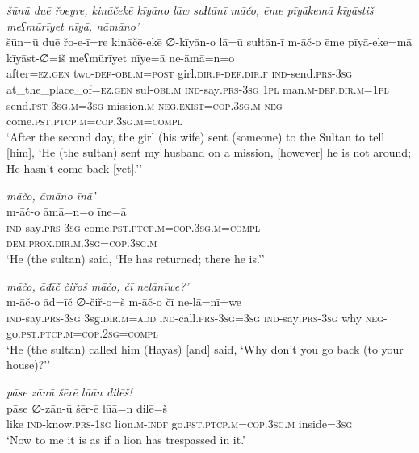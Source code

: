 \ea \label{ŽH.110}
\textit{šūnū duē řoeyre, kināčekē kīyāno lāw suɫtānī māčo, ēme pīyākemā kīyāstiš meʕmūrīyet nīyā, nāmāno’} \\ 
\gll šūn=ū duē řo-e-ī=re kināčē-ekē ∅-kīyān-o lā=ū suɫtān-ī m-āč-o ēme pīyā-eke=mā kīyāst-∅=iš meʕmūrīyet nīye=ā ne-āmā=n=o \\ 
 after\textsc{=ez}\textsc{.gen} two\textsc{-def}\textsc{-obl}\textsc{.m}\textsc{=\textsc{post}} girl\textsc{.dir}\textsc{\textsc{.f}}\textsc{-def}\textsc{.dir}\textsc{\textsc{.f}} \textsc{ind-}send\textsc{.prs}\textsc{-3sg} at\_the\_place\_of\textsc{=ez}\textsc{.gen} sul\textsc{-obl}\textsc{.m} \textsc{ind-}say\textsc{.prs}\textsc{-3sg} \textsc{1pl} man\textsc{.m}\textsc{-def}\textsc{.dir}\textsc{.m}\textsc{=1pl} send\textsc{.pst}\textsc{-3sg}\textsc{.m}\textsc{=3sg} mission\textsc{.m} \textsc{\textsc{neg.}exist}\textsc{=cop}\textsc{.3sg}\textsc{.m} \textsc{neg-}come\textsc{.pst}\textsc{.ptcp}\textsc{.m}\textsc{=cop}\textsc{.3sg}\textsc{.m}\textsc{=compl} \\ 
\glt `After the second day, the girl (his wife) sent (someone) to the Sultan to tell [him], ‘He (the sultan) sent my husband on a mission, [however] he is not around; He hasn’t come back [yet].’'
\z 
 
\ea \label{ŽH.111}
\textit{māčo, āmāno īnā’} \\ 
\gll m-āč-o āmā=n=o īne=ā \\ 
 \textsc{ind-}say\textsc{.prs}\textsc{-3sg} come\textsc{.pst}\textsc{.ptcp}\textsc{.m}\textsc{=cop}\textsc{.3sg}\textsc{.m}\textsc{=compl} \textsc{dem.prox}\textsc{.dir}\textsc{.m}\textsc{.3sg}\textsc{=cop}\textsc{.3sg}\textsc{.m} \\ 
\glt `He (the sultan) said, ‘He has returned; there he is.’'
\z 
 
\ea \label{ŽH.112}
\textit{māčo, āđīč čiřoš māčo, čī nelānīwe?’} \\ 
\gll m-āč-o āđ=īč ∅-čiř-o=š m-āč-o čī ne-lā=nī=we \\ 
 \textsc{ind-}say\textsc{.prs}\textsc{-3sg} 3sg\textsc{.dir}\textsc{.m}\textsc{=add} \textsc{ind-}call\textsc{.prs}\textsc{-3sg}\textsc{=3sg} \textsc{ind-}say\textsc{.prs}\textsc{-3sg} why \textsc{neg-}go\textsc{.pst}\textsc{.ptcp}\textsc{.m}\textsc{=cop}\textsc{.\textsc{2sg}}\textsc{=compl} \\ 
\glt `He (the sultan) called him (Hayas) [and] said, ‘Why don’t you go back (to your house)?’'
\z 
 
\ea \label{ŽH.114}
\textit{pāse zānū šērē lūān dilēš!} \\ 
\gll pāse ∅-zān-ū šēr-ē lūā=n dilē=š \\ 
 like \textsc{ind-}know\textsc{.prs}\textsc{-1sg} lion\textsc{.m}\textsc{-indf} go\textsc{.pst}\textsc{.ptcp}\textsc{.m}\textsc{=cop}\textsc{.3sg}\textsc{.m} inside\textsc{=3sg} \\ 
\glt `Now to me it is as if a lion has trespassed in it.'
\z 
 
